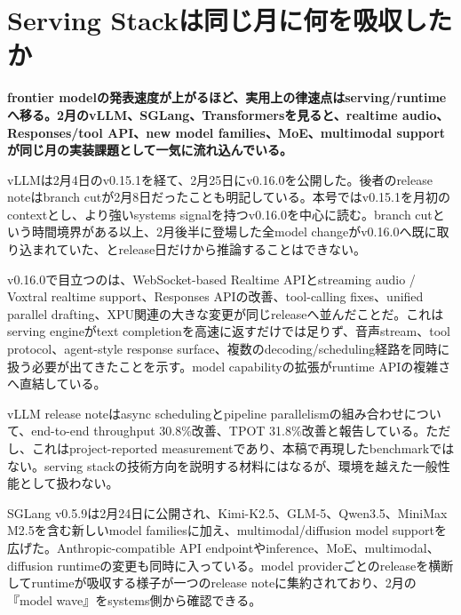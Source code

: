 \section{Serving Stackは同じ月に何を吸収したか}
\noindent\textbf{frontier modelの発表速度が上がるほど、実用上の律速点はserving/runtimeへ移る。2月のvLLM、SGLang、Transformersを見ると、realtime audio、Responses/tool API、new model families、MoE、multimodal supportが同じ月の実装課題として一気に流れ込んでいる。}\autocite{src-5041feb6f87f,src-5bc0746a47c6,src-a43d64987293}

vLLMは2月4日のv0.15.1を経て、2月25日にv0.16.0を公開した。後者のrelease noteはbranch cutが2月8日だったことも明記している。本号ではv0.15.1を月初のcontextとし、より強いsystems signalを持つv0.16.0を中心に読む。branch cutという時間境界がある以上、2月後半に登場した全model changeがv0.16.0へ既に取り込まれていた、とrelease日だけから推論することはできない。\autocite{src-5041feb6f87f,src-67307025f5d9}


v0.16.0で目立つのは、WebSocket-based Realtime APIとstreaming audio / Voxtral realtime support、Responses APIの改善、tool-calling fixes、unified parallel drafting、XPU関連の大きな変更が同じreleaseへ並んだことだ。これはserving engineがtext completionを高速に返すだけでは足りず、音声stream、tool protocol、agent-style response surface、複数のdecoding/scheduling経路を同時に扱う必要が出てきたことを示す。model capabilityの拡張がruntime APIの複雑さへ直結している。\autocite{src-5041feb6f87f}


\begin{claimboundary}
vLLM release noteはasync schedulingとpipeline parallelismの組み合わせについて、end-to-end throughput 30.8\%改善、TPOT 31.8\%改善と報告している。ただし、これはproject-reported measurementであり、本稿で再現したbenchmarkではない。serving stackの技術方向を説明する材料にはなるが、環境を越えた一般性能として扱わない。\autocite{src-5041feb6f87f,src-67307025f5d9}
\end{claimboundary}

SGLang v0.5.9は2月24日に公開され、Kimi-K2.5、GLM-5、Qwen3.5、MiniMax M2.5を含む新しいmodel familiesに加え、multimodal/diffusion model supportを広げた。Anthropic-compatible API endpointやinference、MoE、multimodal、diffusion runtimeの変更も同時に入っている。model providerごとのreleaseを横断してruntimeが吸収する様子が一つのrelease noteに集約されており、2月の『model wave』をsystems側から確認できる。\autocite{src-5bc0746a47c6}


